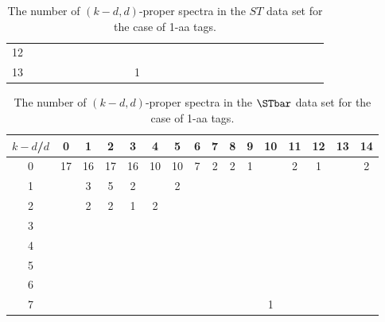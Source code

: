 \begin{landscape}
\begin{table}[h]
{\begin{tabular}{|c|c|
c|c|c|c|c|c|c|c|c|c|c|c|c|c|c|c|c|c|c|c|c|c|c|c|c|}
12  &  &  &  &  &  &  &  &  &  &  &  &  &  &  &  &  &  &  &  &  &  &  &  &  &  & \\

13  &  &  &  &  &  &  &  &  &  & 1 &  &  &  &  &  &  &  &  &  &  &  &  &  &  &  & \\

  \hline
\end{tabular}
\par}
\centering
\caption{The number of $(k-d,d)$-proper spectra in the $ST$ data set for the case of 1-aa tags.}
\vspace{3mm}
\label{table:kd-1-proper-ST}
\end{table}
\end{landscape}
\begin{landscape}

\begin{table}[h]\footnotesize
{\centering
\begin{tabular}{|c|c|
c|c|c|c|c|c|c|c|c|c|c|c|c|c|}
  \hline
  $k-d$/$d$
 & 0 & 1 & 2 & 3 & 4 & 5 & 6 & 7 & 8 & 9 & 10 & 11 & 12 & 13 & 14\\

  \hline
  \hline

0  & 17 & 16 & 17 & 16 & 10 & 10 & 7 & 2 & 2 & 1 &  & 2 & 1 &  & 2\\

1  &  & 3 & 5 & 2 &  & 2 &  &  &  &  &  &  &  &  & \\

2  &  & 2 & 2 & 1 & 2 &  &  &  &  &  &  &  &  &  & \\

3  &  &  &  &  &  &  &  &  &  &  &  &  &  &  & \\

4  &  &  &  &  &  &  &  &  &  &  &  &  &  &  & \\

5  &  &  &  &  &  &  &  &  &  &  &  &  &  &  & \\

6  &  &  &  &  &  &  &  &  &  &  &  &  &  &  & \\

7  &  &  &  &  &  &  &  &  &  &  & 1 &  &  &  & \\

  \hline
\end{tabular}
\par}
\centering
\caption{The number of $(k-d,d)$-proper spectra in the $\STbar$ data set for the case of 1-aa tags.}
\vspace{3mm}
\label{table:kd-1-proper-ST-bar}
\end{table}
\end{landscape}
